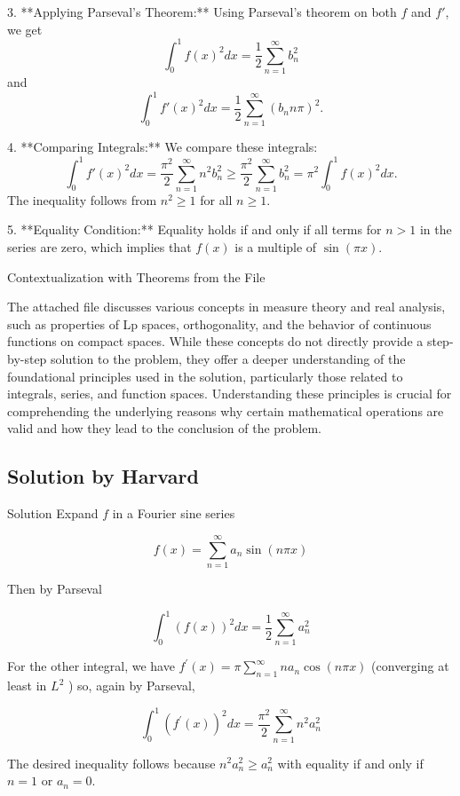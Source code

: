 \documentclass{article}
\begin{document}
3. **Applying Parseval's Theorem:** Using Parseval's theorem on both \( f \) and \( f' \), we get
   $$
   \int_{0}^{1} f(x)^2 dx = \frac{1}{2} \sum_{n=1}^{\infty} b_n^2
   $$
   and
   $$
   \int_{0}^{1} f'(x)^2 dx = \frac{1}{2} \sum_{n=1}^{\infty} (b_n n\pi)^2.
   $$

4. **Comparing Integrals:** We compare these integrals:
   $$
   \int_{0}^{1} f'(x)^2 dx = \frac{\pi^2}{2} \sum_{n=1}^{\infty} n^2 b_n^2 \geq \frac{\pi^2}{2} \sum_{n=1}^{\infty} b_n^2 = \pi^2 \int_{0}^{1} f(x)^2 dx.
   $$
   The inequality follows from \( n^2 \geq 1 \) for all \( n \geq 1 \).

5. **Equality Condition:** Equality holds if and only if all terms for \( n > 1 \) in the series are zero, which implies that \( f(x) \) is a multiple of \( \sin(\pi x) \).

Contextualization with Theorems from the File

The attached file discusses various concepts in measure theory and real analysis, such as properties of Lp spaces, orthogonality, and the behavior of continuous functions on compact spaces. While these concepts do not directly provide a step-by-step solution to the problem, they offer a deeper understanding of the foundational principles used in the solution, particularly those related to integrals, series, and function spaces. Understanding these principles is crucial for comprehending the underlying reasons why certain mathematical operations are valid and how they lead to the conclusion of the problem.

\subsection{Solution by Harvard}

Solution Expand $f$ in a Fourier sine series

$$
f(x)=\sum_{n=1}^{\infty} a_{n} \sin (n \pi x)
$$

Then by Parseval

$$
\int_{0}^{1}(f(x))^{2} d x=\frac{1}{2} \sum_{n=1}^{\infty} a_{n}^{2}
$$

For the other integral, we have $f^{\prime}(x)=\pi \sum_{n=1}^{\infty} n a_{n} \cos (n \pi x)$ (converging at least in $L^{2}$ ) so, again by Parseval,

$$
\int_{0}^{1}\left(f^{\prime}(x)\right)^{2} d x=\frac{\pi^{2}}{2} \sum_{n=1}^{\infty} n^{2} a_{n}^{2}
$$

The desired inequality follows because $n^{2} a_{n}^{2} \geq a_{n}^{2}$ with equality if and only if $n=1$ or $a_{n}=0$.
\end{document}

